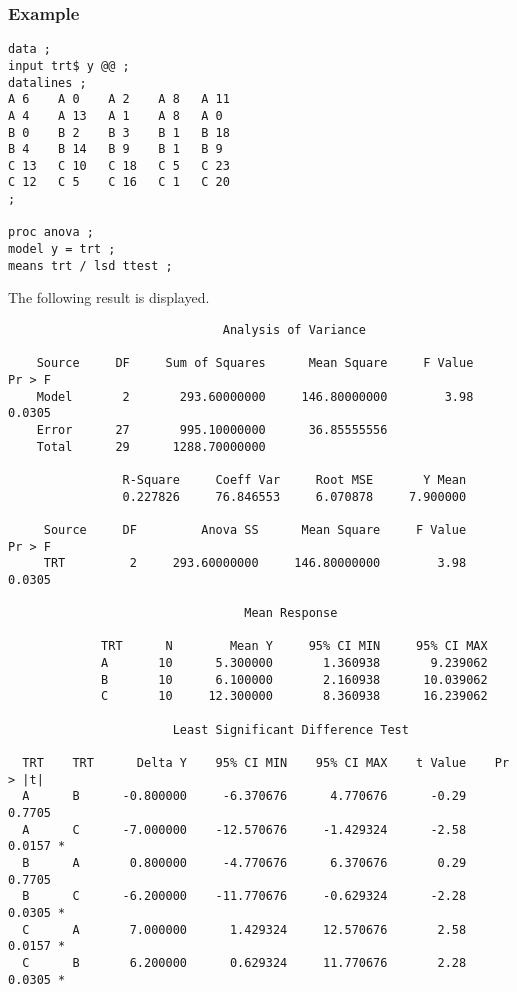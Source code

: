 \documentclass[12pt]{article}
\begin{document}
\subsubsection*{Example}

{\footnotesize\begin{verbatim}
data ;
input trt$ y @@ ;
datalines ;
A 6    A 0    A 2    A 8   A 11
A 4    A 13   A 1    A 8   A 0
B 0    B 2    B 3    B 1   B 18
B 4    B 14   B 9    B 1   B 9
C 13   C 10   C 18   C 5   C 23
C 12   C 5    C 16   C 1   C 20
;

proc anova ;
model y = trt ;
means trt / lsd ttest ;
\end{verbatim}}

The following result is displayed.

{\footnotesize\begin{verbatim}
                              Analysis of Variance

    Source     DF     Sum of Squares      Mean Square     F Value     Pr > F
    Model       2       293.60000000     146.80000000        3.98     0.0305
    Error      27       995.10000000      36.85555556                       
    Total      29      1288.70000000                                        

                R-Square     Coeff Var     Root MSE       Y Mean
                0.227826     76.846553     6.070878     7.900000

     Source     DF         Anova SS      Mean Square     F Value     Pr > F
     TRT         2     293.60000000     146.80000000        3.98     0.0305

                                 Mean Response

             TRT      N        Mean Y     95% CI MIN     95% CI MAX
             A       10      5.300000       1.360938       9.239062
             B       10      6.100000       2.160938      10.039062
             C       10     12.300000       8.360938      16.239062

                       Least Significant Difference Test

  TRT    TRT      Delta Y    95% CI MIN    95% CI MAX    t Value    Pr > |t|  
  A      B      -0.800000     -6.370676      4.770676      -0.29      0.7705  
  A      C      -7.000000    -12.570676     -1.429324      -2.58      0.0157 *
  B      A       0.800000     -4.770676      6.370676       0.29      0.7705  
  B      C      -6.200000    -11.770676     -0.629324      -2.28      0.0305 *
  C      A       7.000000      1.429324     12.570676       2.58      0.0157 *
  C      B       6.200000      0.629324     11.770676       2.28      0.0305 *


\end{verbatim}}
\end{document}
